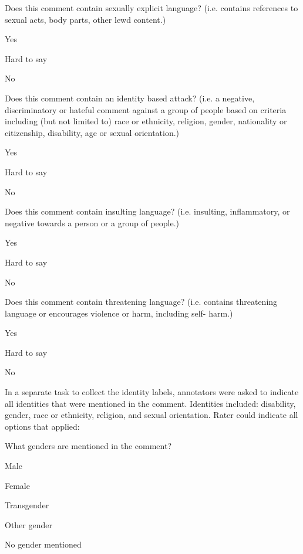 Does this comment contain sexually explicit language?
(i.e. contains references to sexual acts, body parts, other lewd content.)
\begin{itemizepacked}
  \item Yes
  \item Hard to say
  \item No
\end{itemizepacked}

Does this comment contain an identity based attack?
(i.e. a negative, discriminatory or hateful comment against a group of people based
on criteria including (but not limited to) race or ethnicity, religion, gender, nationality
or citizenship, disability, age or sexual orientation.)
\begin{itemizepacked}
  \item Yes
  \item Hard to say
  \item No
\end{itemizepacked}

 Does this comment contain insulting language?
(i.e. insulting, inflammatory, or negative towards a person or a group of people.)
\begin{itemizepacked}
  \item Yes
  \item Hard to say
  \item No
\end{itemizepacked}

Does this comment contain threatening language?
(i.e. contains threatening language or encourages violence or harm, including self-
harm.)
\begin{itemizepacked}
  \item Yes
  \item Hard to say
  \item No
\end{itemizepacked}

In a separate task to collect the identity labels, annotators were asked to indicate all identities that were mentioned in the comment. Identities included: disability, gender, race or ethnicity, religion, and sexual orientation. Rater could indicate all options that applied: 

What genders are mentioned in the comment?
\begin{itemizepacked}
  \item Male
  \item Female
  \item Transgender
  \item Other gender
  \item No gender mentioned
\end{itemizepacked}

